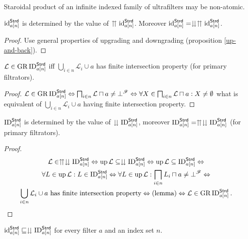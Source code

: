 \begin{cor}
Staroidal product of an infinite indexed family of ultrafilters may
be non-atomic.\end{cor}
\begin{prop}
$\operatorname{id}_{a[n]}^{\mathsf{Strd}}$ is determined by the value of $\upuparrows\operatorname{id}_{a[n]}^{\mathsf{Strd}}$.
Moreover $\operatorname{id}_{a[n]}^{\mathsf{Strd}}=\downdownarrows\upuparrows\operatorname{id}_{a[n]}^{\mathsf{Strd}}$.\end{prop}
\begin{proof}
Use general properties of upgrading and downgrading (proposition \ref{up-and-back}).\end{proof}
\begin{lem}
$\mathcal{L}\in\operatorname{GR}\operatorname{ID}_{a[n]}^{\mathsf{Strd}}$ iff $\bigcup_{i\in n}\mathcal{L}_{i}\cup a$
has finite intersection property (for primary filtrators).\end{lem}
\begin{proof}
$\mathcal{L}\in\operatorname{GR}\operatorname{ID}_{a[n]}^{\mathsf{Strd}}\Leftrightarrow\bigsqcap_{i\in n}\mathcal{L}\sqcap a\neq\bot^{\mathscr{F}}\Leftrightarrow\forall X\in\bigsqcap_{i\in n}\mathcal{L}\sqcap a:X\neq\emptyset$
what is equivalent of $\bigcup_{i\in n}\mathcal{L}_{i}\cup a$ having
finite intersection property.\end{proof}
\begin{prop}
$\operatorname{ID}_{a[n]}^{\mathsf{Strd}}$ is determined by the value of $\downdownarrows\operatorname{ID}_{a[n]}^{\mathsf{Strd}}$,
moreover $\operatorname{ID}_{a[n]}^{\mathsf{Strd}}=\upuparrows\downdownarrows\operatorname{ID}_{a[n]}^{\mathsf{Strd}}$
(for primary filtrators).\end{prop}
\begin{proof}
~
\begin{multline*}
\mathcal{L}\in\upuparrows\downdownarrows\operatorname{ID}_{a[n]}^{\mathsf{Strd}}\Leftrightarrow\operatorname{up}\mathcal{L}\subseteq\downdownarrows\operatorname{ID}_{a[n]}^{\mathsf{Strd}}\Leftrightarrow\operatorname{up}\mathcal{L}\subseteq\operatorname{ID}_{a[n]}^{\mathsf{Strd}}\Leftrightarrow\\
\forall L\in\operatorname{up}\mathcal{L}:L\in\operatorname{ID}_{a[n]}^{\mathsf{Strd}}\Leftrightarrow\forall L\in\operatorname{up}\mathcal{L}:\bigsqcap_{i\in n}L_{i}\sqcap a\neq\bot^{\mathscr{F}}\Leftrightarrow\\
\bigcup_{i\in n}\mathcal{L}_{i}\cup a\text{ has finite intersection property}\Leftrightarrow\text{(lemma)}\Leftrightarrow\mathcal{L}\in\operatorname{GR}\operatorname{ID}_{a[n]}^{\mathsf{Strd}}.
\end{multline*}
\end{proof}
\begin{prop}
$\operatorname{id}_{a[n]}^{\mathsf{Strd}}\sqsubseteq\downdownarrows\operatorname{ID}_{a[n]}^{\mathsf{Strd}}$
for every filter $a$ and an index set $n$.\end{prop}
